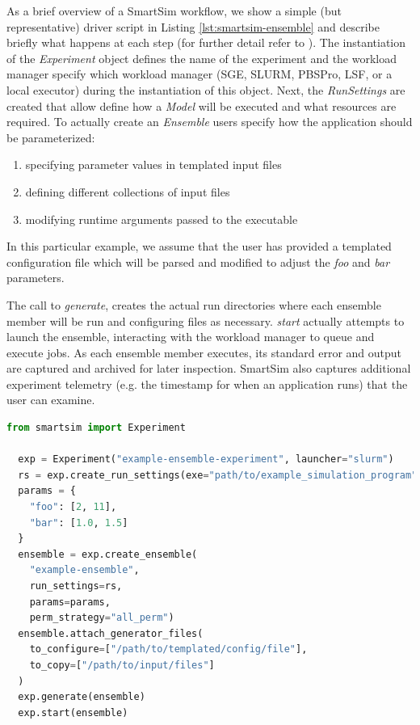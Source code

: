 \documentclass[sigconf]{acmart}
\begin{document}
As a brief overview of a SmartSim workflow, we show a simple (but representative) driver script in Listing \ref{lst:smartsim-ensemble} and describe briefly what happens at each step (for further detail refer to \citep{smartsim-repo}).  The instantiation of the {\em Experiment} object defines the name of the experiment and the workload manager specify which workload manager (SGE, SLURM, PBSPro, LSF, or a local executor) during the instantiation of this object. Next, the {\em RunSettings} are created that allow define how a {\em Model} will be executed and what resources are required. To actually create an {\em Ensemble} users specify how the application should be parameterized:  

\begin{enumerate}
    \item specifying parameter values in templated input files
    \item defining different collections of input files
    \item modifying runtime arguments passed to the executable
\end{enumerate}

In this particular example, we assume that the user has provided a templated configuration file which will be parsed and modified to adjust the {\em foo} and {\em bar} parameters.

The call to {\em generate}, creates the actual run directories where each ensemble member will be run and configuring files as necessary. {\em start} actually attempts to launch the ensemble, interacting with the workload manager to queue and execute jobs. As each ensemble member executes, its standard error and output are captured and archived for later inspection. SmartSim also captures additional experiment telemetry (e.g. the timestamp for when an application runs) that the user can examine.

\begin{lstlisting}[language=python,caption={Configuration of an ensemble in 
  SmartSim},captionpos=b,label=lst:smartsim-ensemble,basicstyle=\small]
  from smartsim import Experiment

  exp = Experiment("example-ensemble-experiment", launcher="slurm")
  rs = exp.create_run_settings(exe="path/to/example_simulation_program")
  params = {
    "foo": [2, 11],
    "bar": [1.0, 1.5]
  }
  ensemble = exp.create_ensemble(
    "example-ensemble", 
    run_settings=rs, 
    params=params, 
    perm_strategy="all_perm")
  ensemble.attach_generator_files(
    to_configure=["/path/to/templated/config/file"],
    to_copy=["/path/to/input/files"]
  )
  exp.generate(ensemble)
  exp.start(ensemble)
\end{lstlisting}
\end{document}
